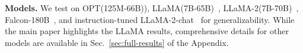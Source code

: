 \documentclass{article} %
\begin{document}
\textbf{Models.} We test on OPT(125M-66B)\citep{opt}), LLaMA(7B-65B)~\citep{llama}, LLaMA-2(7B-70B)~\citep{llama2}, Falcon-180B~\citep{falcon}, and instruction-tuned LLaMA-2-chat~\citep{llama2} for generalizability. While the main paper highlights the LLaMA results, comprehensive details for other models are available in Sec.~\ref{sec:full-results} of the Appendix.


\end{document}
